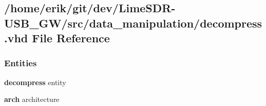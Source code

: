 \subsection{/home/erik/git/dev/\+Lime\+S\+D\+R-\/\+U\+S\+B\+\_\+\+G\+W/src/data\+\_\+manipulation/decompress.vhd File Reference}
\label{decompress_8vhd}
\subsubsection*{Entities}
\begin{DoxyCompactItemize}
\item 
{\bf decompress} entity
\item 
{\bf arch} architecture
\end{DoxyCompactItemize}
